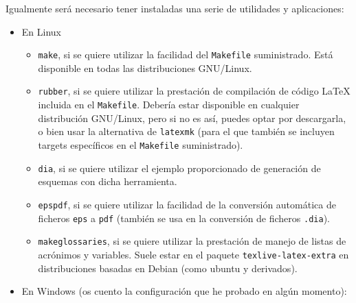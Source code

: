 \documentclass[spanish,openright]{book}
\begin{document}
Igualmente será necesario tener instaladas una serie de utilidades y
aplicaciones:

\begin{itemize}
\item En Linux

\begin{itemize}
\item \texttt{make}, si se quiere utilizar la facilidad del
\texttt{Makefile} suministrado. Está disponible en todas las
distribuciones GNU/Linux.
\item \texttt{rubber}, si se quiere utilizar la prestación de
compilación de código \LaTeX{} incluida en el
\texttt{Makefile}. Debería estar disponible en cualquier distribución
GNU/Linux, pero si no es así, puedes optar por descargarla, o bien
usar la alternativa de \texttt{latexmk} (para el que también se
incluyen targets específicos en el \texttt{Makefile} suministrado).
\item \texttt{dia}, si se quiere utilizar el ejemplo proporcionado de
generación de esquemas con dicha herramienta.
\item \texttt{epspdf}, si se quiere utilizar la facilidad de la
conversión automática de ficheros \texttt{eps} a \texttt{pdf} (también
se usa en la conversión de ficheros \texttt{.dia}).
\item \texttt{makeglossaries}, si se quiere utilizar la prestación de
manejo de listas de acrónimos y variables. Suele estar en el paquete
\texttt{texlive-latex-extra} en distribuciones basadas en Debian
(como ubuntu y derivados).
\end{itemize}

\item En Windows (os cuento la configuración que he probado en algún momento):


\end{itemize}
\end{document}
